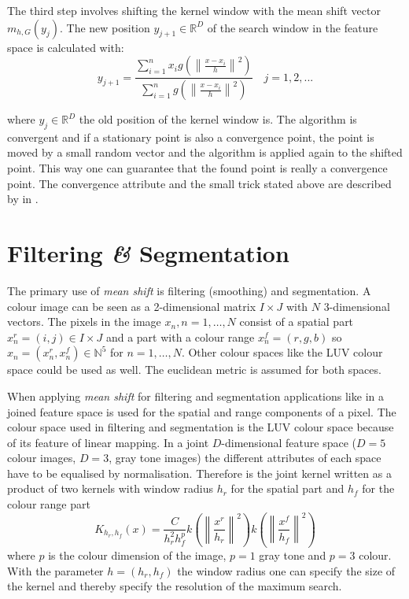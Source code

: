 The third step involves shifting the kernel window with the mean shift
vector $m_{h,G}(y_j)$. The new position $y_{j+1} \in \mathbb{R}^D$ of
the search window in the feature space is calculated with:
\begin{equation}\label{eq:msproc}
  y_{j+1} = 
  \frac{\sum_{i=1}^n x_i g\left(\left\lVert \frac{x - x_i}{h}
      \right\rVert^2\right)}{\sum_{i=1}^n g\left(\left\lVert \frac{x - x_i}{h}
      \right\rVert^2\right)} \quad j = 1,2,...
\end{equation}


where $y_j \in \mathbb{R}^D$ the old position of the kernel window
is. The algorithm is convergent and if a stationary point is also a
convergence point, the point is moved by a small random vector and the
algorithm is applied again to the shifted point. This way one can
guarantee that the found point is really a convergence point. The
convergence attribute and the small trick stated above are described
by \citeauthor{citeulike:462300} in \citep{citeulike:462300}.


\section{Filtering {\itshape\&} Segmentation} %
\label{sec:filtering_segmentation}
The primary use of \emph{mean shift} is filtering (smoothing) and
segmentation.  A colour image can be seen as a 2-dimensional matrix $I
\times J$ with $N$ 3-dimensional vectors. The pixels in the image
$x_n, n = 1, \ldots , N$ consist of a spatial part $x_n^r = (i,j) \in
I \times J$ and a part with a colour range $x_n^f = (r,g,b)$ so $x_n =
(x_n^r, x_n^f) \in \mathbb{N}^5$ for $n = 1, \ldots , N$.  Other colour
spaces like the \gls{LUV} colour space could be used as well. The
euclidean metric is assumed for both spaces.

When applying \emph{mean shift} for filtering and segmentation
applications like in \citeauthor{citeulike:462300}
\citep{citeulike:462300} a joined feature space is used for the
spatial and range components of a pixel. The colour space used in
filtering and segmentation is the \gls{LUV} colour space because of its
feature of linear mapping. In a joint $D$-dimensional feature space
($D=5$ colour images, $D=3$, gray tone images) the different attributes
of each space have to be equalised by normalisation. Therefore is the
joint kernel written as a product of two kernels with window radius
$h_r$ for the spatial part and $h_f$ for the colour range part
\begin{equation}\label{eq:jokernel}
  K_{h_r, h_f}(x) = \frac{C}{h_r^2h_f^p}
  k \left( \left\lVert \frac{x^r}{h_r} \right\rVert^2\right) 
  k \left( \left\lVert \frac{x^f}{h_f} \right\rVert^2\right) 
\end{equation}
where $p$ is the colour dimension of the image, $p=1$ gray tone and
$p=3$ colour. With the parameter $h = (h_r,
h_f)$ the window radius one can specify the size of the kernel and
thereby specify the resolution of the maximum search.

